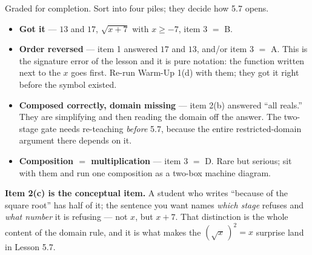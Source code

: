 \documentclass[10pt]{article}
\begin{document}
\begin{teachernote}
\small Graded for completion. Sort into four piles; they decide how 5.7 opens.
\begin{itemize}[leftmargin=1.3em, nosep]
  \item \textbf{Got it} --- $13$ and $17$, $\sqrt{x+7}$ with $x\ge-7$, item 3 $=$ B.
  \item \textbf{Order reversed} --- item 1 answered $17$ and $13$, and/or item 3 $=$ A. This is the
        signature error of the lesson and it is pure notation: the function written next to the $x$
        goes first. Re-run Warm-Up 1(d) with them; they got it right before the symbol existed.
  \item \textbf{Composed correctly, domain missing} --- item 2(b) answered ``all reals.'' They are
        simplifying and then reading the domain off the answer. The two-stage gate needs re-teaching
        \emph{before} 5.7, because the entire restricted-domain argument there depends on it.
  \item \textbf{Composition $=$ multiplication} --- item 3 $=$ D. Rare but serious; sit with them and
        run one composition as a two-box machine diagram.
\end{itemize}
\textbf{Item 2(c) is the conceptual item.} A student who writes ``because of the square root'' has
half of it; the sentence you want names \emph{which stage} refuses and \emph{what number} it is
refusing --- not $x$, but $x+7$. That distinction is the whole content of the domain rule, and it is
what makes the $\left(\sqrt{x}\,\right)^{2}=x$ surprise land in Lesson 5.7.
\end{teachernote}
\end{document}
